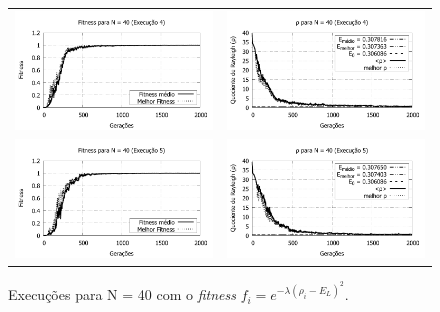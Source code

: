 \begin{figure}[p]
\begin{tabular}{@{}cc@{}}
		\includegraphics[width=.40\textwidth]{figs/resultados/fitnessEL/N-40_E-4_fitness-extendido.pdf} &
    \includegraphics[width=.40\textwidth]{figs/resultados/fitnessEL/N-40_E-4_rho_extendido.pdf}		\\
		\includegraphics[width=.40\textwidth]{figs/resultados/fitnessEL/N-40_E-5_fitness-extendido.pdf} &
    \includegraphics[width=.40\textwidth]{figs/resultados/fitnessEL/N-40_E-5_rho_extendido.pdf}
  \end{tabular}
  \caption{Execuções para N = 40 com o \textit{fitness} $f_i = e^{-\lambda(\rho_i - E_L)^2}$.}
	\label{fig:execucoes_N40_EL}
	\end{figure}
	
	
